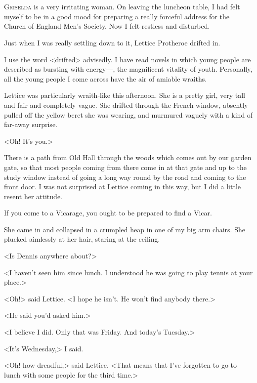 \chapter[Chapter  \thechapter]{}


\lettrine{G}{riselda} is a very irritating woman. On leaving the luncheon table, I had felt myself to be in a good mood for preparing a really forceful address for the Church of England Men's Society. Now I felt restless and disturbed.

Just when I was really settling down to it, Lettice Protheroe drifted in.

I use the word <drifted> advisedly. I have read novels in which young people are described as bursting with energy—, the magnificent vitality of youth. Personally, all the young people I come across have the air of amiable wraiths.

Lettice was particularly wraith-like this afternoon. She is a pretty girl, very tall and fair and completely vague. She drifted through the French window, absently pulled off the yellow beret she was wearing, and murmured vaguely with a kind of far-away surprise.

<Oh! It's you.>

There is a path from Old Hall through the woods which comes out by our garden gate, so that most people coming from there come in at that gate and up to the study window instead of going a long way round by the road and coming to the front door. I was not surprised at Lettice coming in this way, but I did a little resent her attitude.

If you come to a Vicarage, you ought to be prepared to find a Vicar.

She came in and collapsed in a crumpled heap in one of my big arm chairs. She plucked aimlessly at her hair, staring at the ceiling.

<Is Dennis anywhere about?>

<I haven't seen him since lunch. I understood he was going to play tennis at your place.>

<Oh!> said Lettice. <I hope he isn't. He won't find anybody there.>

<He said you'd asked him.>

<I believe I did. Only that was Friday. And today's Tuesday.>

<It's Wednesday,> I said.

<Oh! how dreadful,> said Lettice. <That means that I've forgotten to go to lunch with some people for the third time.>

